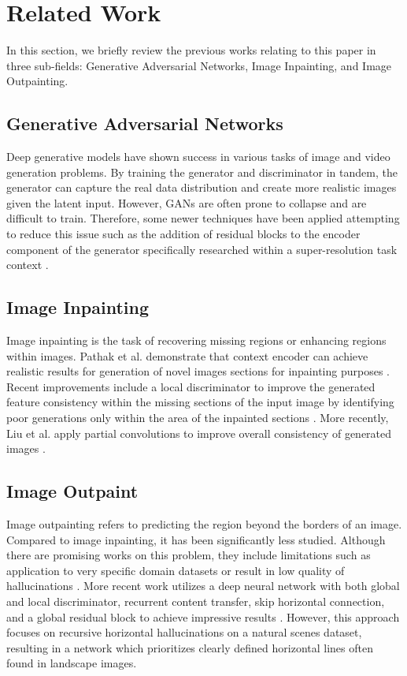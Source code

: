 \documentclass{article}
\begin{document}
\section{Related Work}
In this section, we briefly review the previous works relating to this paper in three sub-fields: Generative Adversarial Networks, Image Inpainting, and Image Outpainting.

\subsection{Generative Adversarial Networks}
Deep generative models have shown success in various tasks of image and video generation problems. By training the generator and discriminator in tandem, the generator can capture the real data distribution and create more realistic images given the latent input. However, GANs are often prone to collapse and are difficult to train. Therefore, some newer techniques have been applied attempting to reduce this issue such as the addition of residual blocks to the encoder component of the generator specifically researched within a super-resolution task context \citep{lim_enhanced_2017}.

\subsection{Image Inpainting}
Image inpainting is the task of recovering missing regions or enhancing regions within images. Pathak et al. demonstrate that context encoder can achieve realistic results for generation of novel images sections for inpainting purposes \citep{pathak_context_2016}. Recent improvements include a local discriminator to improve the generated feature consistency within the missing sections of the input image by identifying poor generations only within the area of the inpainted sections \citep{iizuka_globally_2017}. More recently, Liu et al. apply partial convolutions to improve overall consistency of generated images \citep{liu_image_2018}.

\subsection{Image Outpaint}
Image outpainting refers to predicting the region beyond the borders of an image. Compared to image inpainting, it has been significantly less studied. Although there are promising works on this problem, they include limitations such as application to very specific domain datasets or result in low quality of hallucinations \citep{van_hoorick_image_2020}\citep{wang_wide-context_2019}. More recent work utilizes a deep neural network with both global and local discriminator, recurrent content transfer, skip horizontal connection, and a global residual block to achieve impressive results \citep{yang_very_2019}. However, this approach focuses  on recursive horizontal hallucinations on a natural scenes dataset, resulting in a network which prioritizes clearly defined horizontal lines often found in landscape images.
\end{document}
